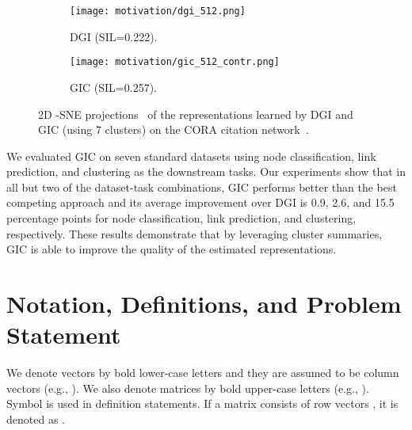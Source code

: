 \documentclass{article}
\begin{document}
\begin{figure}
\begin{center}

\begin{subfigure}[t]{0.20\columnwidth}
   \centering
   \texttt{[image: motivation/dgi\_512.png]}
   \caption{DGI (SIL=0.222).}
\end{subfigure}\hspace{15pt}
\begin{subfigure}[t]{0.20\columnwidth}
  \centering
  \texttt{[image: motivation/gic\_512\_contr.png]}
  \caption{GIC (SIL=0.257).}
\end{subfigure}\end{center}
\caption{2D -SNE projections~\cite{maaten2008visualizing} of the representations learned by DGI and GIC (using 7 clusters) on the CORA citation network~\cite{Mccallum00automatingthe}.}
\label{figintro}
\end{figure}




We evaluated GIC on seven standard datasets using node classification, link prediction, and clustering as the downstream tasks. Our experiments show that in all but two of the dataset-task combinations, GIC performs better than the best competing approach and its average improvement over DGI is 0.9, 2.6, and 15.5 percentage points for node classification, link prediction, and clustering, respectively. These results demonstrate that by 
leveraging cluster summaries, GIC is able to improve the quality of the estimated representations.


\section{Notation, Definitions, and Problem Statement}



We denote vectors by bold lower-case letters and they are assumed to be column vectors (e.g., ). We also denote matrices by bold upper-case letters (e.g., ). Symbol  is used in definition statements. If a matrix  consists of row vectors , it is denoted as . 
\end{document}
